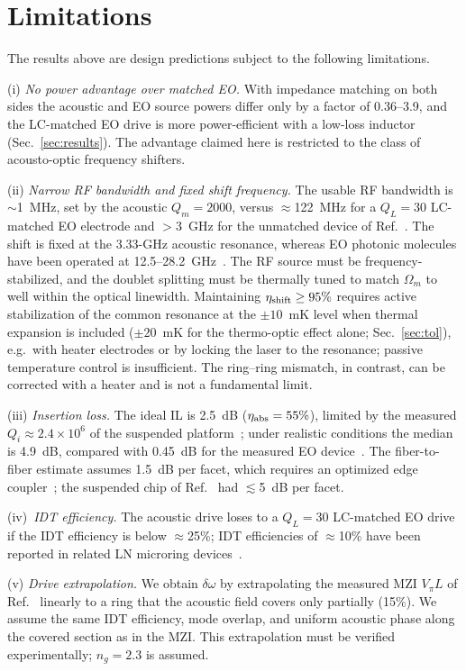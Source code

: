 \documentclass[aps,prapplied,reprint,superscriptaddress,amsmath,amssymb,floatfix]{revtex4-2}
\newcommand{\etash}{\eta_{\rm shift}}
\newcommand{\etaabs}{\eta_{\rm abs}}
\begin{document}
\section{Limitations}\label{sec:lim}
The results above are design predictions subject to the following limitations.

(i) \emph{No power advantage over matched EO.} With impedance matching on both sides the acoustic and EO source powers differ only by a factor of 0.36--3.9, and the LC-matched EO drive is more power-efficient with a low-loss inductor (Sec.~\ref{sec:results}). The advantage claimed here is restricted to the class of acousto-optic frequency shifters.

(ii) \emph{Narrow RF bandwidth and fixed shift frequency.} The usable RF bandwidth is $\sim$1~MHz, set by the acoustic $Q_m=2000$, versus $\approx$122~MHz for a $Q_L=30$ LC-matched EO electrode and $>$3~GHz for the unmatched device of Ref.~\cite{Hu2021}. The shift is fixed at the 3.33-GHz acoustic resonance, whereas EO photonic molecules have been operated at 12.5--28.2~GHz~\cite{Hu2021}. The RF source must be frequency-stabilized, and the doublet splitting must be thermally tuned to match $\Omega_m$ to well within the optical linewidth. Maintaining $\etash\ge95\%$ requires active stabilization of the common resonance at the $\pm10$~mK level when thermal expansion is included ($\pm20$~mK for the thermo-optic effect alone; Sec.~\ref{sec:tol}), e.g.\ with heater electrodes or by locking the laser to the resonance; passive temperature control is insufficient. The ring--ring mismatch, in contrast, can be corrected with a heater and is not a fundamental limit.

(iii) \emph{Insertion loss.} The ideal IL is 2.5~dB ($\etaabs=55\%$), limited by the measured $Q_i\approx2.4\times10^6$ of the suspended platform~\cite{Shao2019}; under realistic conditions the median is 4.9~dB, compared with 0.45~dB for the measured EO device~\cite{Hu2021}. The fiber-to-fiber estimate assumes 1.5~dB per facet, which requires an optimized edge coupler~\cite{Jia2023}; the suspended chip of Ref.~\cite{Shao2019} had $\lesssim$5~dB per facet.

(iv)~\emph{IDT efficiency.} The acoustic drive loses to a $Q_L=30$ LC-matched EO drive if the IDT efficiency is below $\approx$25\%; IDT efficiencies of $\approx$10\% have been reported in related LN microring devices~\cite{Xu2025b}.

(v) \emph{Drive extrapolation.} We obtain $\delta\omega$ by extrapolating the measured MZI $V_\pi L$ of Ref.~\cite{Shao2019} linearly to a ring that the acoustic field covers only partially (15\%). We assume the same IDT efficiency, mode overlap, and uniform acoustic phase along the covered section as in the MZI. This extrapolation must be verified experimentally; $n_g=2.3$ is assumed.
\end{document}
